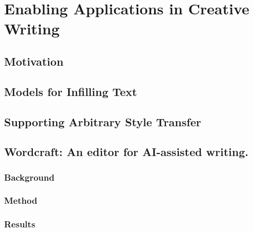 \chapter{Enabling Applications in Creative Writing}
\label{chap:creativity}

\section{Motivation}

\section{Models for Infilling Text}

\section{Supporting Arbitrary Style Transfer}

\section{Wordcraft: An editor for AI-assisted writing.}
\subsection{Background}
\subsection{Method}
\subsection{Results}
